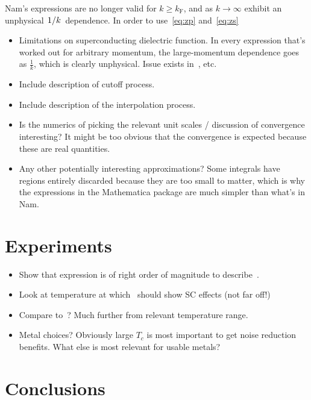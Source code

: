 \documentclass{article}
\begin{document}
	Nam's expressions are no longer valid for $k \geq k_\mathrm{F}$, and as $k \rightarrow \infty$ exhibit an unphysical $\flatfrac{1}{k}$ dependence.
	In order to use~\eqref{eq:zp} and~\eqref{eq:zs}
\begin{itemize}
	\item Limitations on superconducting dielectric function.
	In every expression that's worked out for arbitrary momentum, the large-momentum dependence goes as $\frac{1}{k}$, which is clearly unphysical.
	Issue exists in~\cite{Nam1967, AGD, Tinkham}, etc.
	\item Include description of cutoff process.
	\item Include description of the interpolation process.
	\item Is the numerics of picking the relevant unit scales / discussion of convergence interesting?
	It might be too obvious that the convergence is expected because these are real quantities.
	\item Any other potentially interesting approximations?
	Some integrals have regions entirely discarded because they are too small to matter, which is why the expressions in the Mathematica package are much simpler than what's in Nam.
\end{itemize}

\section{Experiments \label{sec:experiments}}
\begin{itemize}
	\item Show that expression is of right order of magnitude to describe~\cite{Tenberg2019}.
	\item Look at temperature at which~\cite{Tenberg2019} should show SC effects (not far off!)
	\item Compare to~\cite{Kolkowitz2015}?
	Much further from relevant temperature range.
	\item Metal choices?
	Obviously large $T_c$ is most important to get noise reduction benefits.
	What else is most relevant for usable metals?
\end{itemize}
\section{Conclusions \label{sec:conclusions}}

\printbibliography
\end{document}
